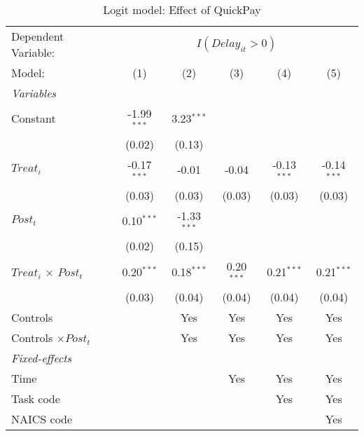 \documentclass[
]{article}
\begin{document}
\begin{table}[htbp]
   \caption{Logit model: Effect of QuickPay}
   \centering
   \begin{tabular}{lccccc}
      \tabularnewline \midrule \midrule
      Dependent Variable: & \multicolumn{5}{c}{$I(Delay_{it}>0)$}\\
      Model:                       & (1)           & (2)           & (3)          & (4)           & (5)\\  
      \midrule
      \emph{Variables}\\
      Constant                     & -1.99$^{***}$ & 3.23$^{***}$  &              &               &   \\   
                                   & (0.02)        & (0.13)        &              &               &   \\   
      $Treat_i$                    & -0.17$^{***}$ & -0.01         & -0.04        & -0.13$^{***}$ & -0.14$^{***}$\\   
                                   & (0.03)        & (0.03)        & (0.03)       & (0.03)        & (0.03)\\   
      $Post_t$                     & 0.10$^{***}$  & -1.33$^{***}$ &              &               &   \\   
                                   & (0.02)        & (0.15)        &              &               &   \\   
      $Treat_i$ $\times$ $Post_t$  & 0.20$^{***}$  & 0.18$^{***}$  & 0.20$^{***}$ & 0.21$^{***}$  & 0.21$^{***}$\\   
                                   & (0.03)        & (0.04)        & (0.04)       & (0.04)        & (0.04)\\   
      Controls                     &               & Yes           & Yes          & Yes           & Yes\\  
      Controls $\times Post_t$     &               & Yes           & Yes          & Yes           & Yes\\  
      \midrule
      \emph{Fixed-effects}\\
      Time                         &               &               & Yes          & Yes           & Yes\\  
      Task code                    &               &               &              & Yes           & Yes\\  
      NAICS code                   &               &               &              &               & Yes\\  
      \midrule

\end{tabular}
\end{table}
\end{document}

